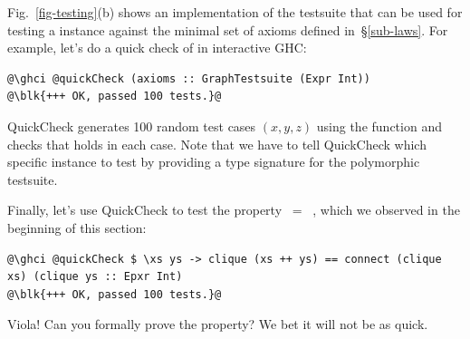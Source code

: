 Fig.~\ref{fig-testing}(b) shows an implementation of the 
testsuite that can be used for testing a  instance against
the minimal set of axioms defined in~\S\ref{sub-laws}.
For example, let's do a quick check of  in interactive GHC:

\begin{verbatim}
@\ghci @quickCheck (axioms :: GraphTestsuite (Expr Int))
@\blk{+++ OK, passed 100 tests.}@
\end{verbatim}

\noindent
QuickCheck generates 100 random test cases $(x,y,z)$ using the 
function and checks that  holds in each case. Note
that we have to tell QuickCheck which specific  instance to test
by providing a type signature for the polymorphic  testsuite.

Finally, let's use QuickCheck to test the property
 $\ =\ $ ,
which we observed in the beginning of this section:

\begin{verbatim}
@\ghci @quickCheck $ \xs ys -> clique (xs ++ ys) == connect (clique xs) (clique ys :: Epxr Int)
@\blk{+++ OK, passed 100 tests.}@
\end{verbatim}

\noindent
Viola! Can you formally prove the property? We bet it will not be as quick.
